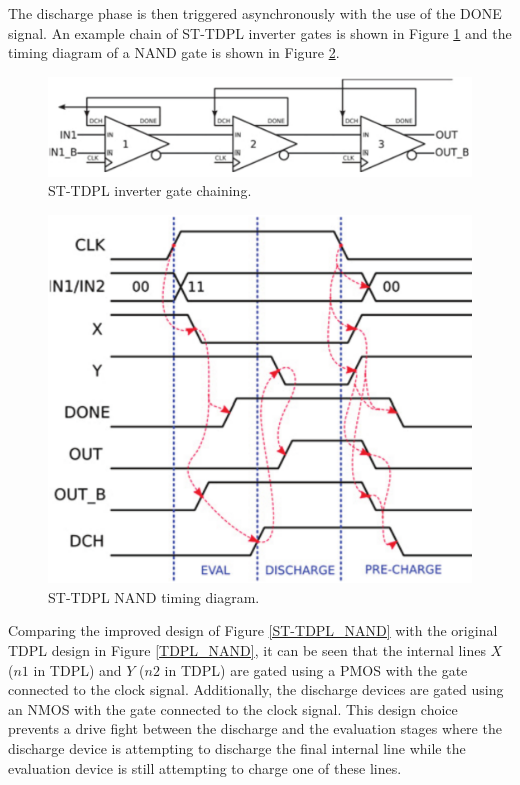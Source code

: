 \documentclass[conference, 12pt]{IEEEtran}
\newcommand{\x}{1}						%
\begin{document}
			The discharge phase is then triggered asynchronously with the use of the DONE signal. An example chain of ST-TDPL inverter gates is shown in Figure \ref{ST-TDPL_INV_Chain} and the timing diagram of a NAND gate is shown in Figure \ref{ST-TDPL_NAND_Timing}.

			\begin{figure}[tbp]
				\centering
				\includegraphics[width=\x\linewidth]{ReportFiles/ST-TDPL_INV_Chain.png}
				\caption{ST-TDPL inverter gate chaining.\cite{b2}}
				\label{ST-TDPL_INV_Chain}
			\end{figure}

			\begin{figure}[tbp]
				\centering
				\includegraphics[width=\x\linewidth]{ReportFiles/ST-TDPL_NAND_Timing.png}
				\caption{ST-TDPL NAND timing diagram.\cite{b2}}
				\label{ST-TDPL_NAND_Timing}
			\end{figure}

			Comparing the improved design of Figure \ref{ST-TDPL_NAND} with the original TDPL design in Figure \ref{TDPL_NAND}, it can be seen that the internal lines $X$ ($n1$ in TDPL) and $Y$ ($n2$ in TDPL) are gated using a PMOS with the gate connected to the clock signal. Additionally, the discharge devices are gated using an NMOS with the gate connected to the clock signal. This design choice prevents a drive fight between the discharge and the evaluation stages where the discharge device is attempting to discharge the final internal line while the evaluation device is still attempting to charge one of these lines. 
\end{document}
